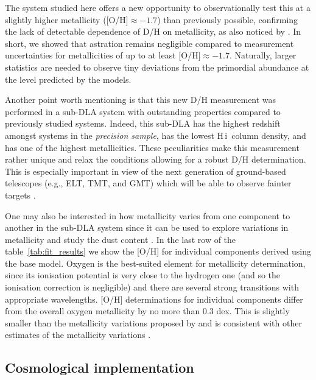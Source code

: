 \documentclass[fleqn,usenatbib]{mnras}
\newcommand{\PK}[1]{{\color{cyan} PK:~ #1}}
\newcommand{\PN}[2][]{{\color{orange} PN:\st{#1}~#2}}  %
\newcommand{\HI}[0]{H\,{\sc i}}
\begin{document}
The system studied here offers a new opportunity to observationally test this at a slightly higher metallicity ([O/H$]\approx -1.7$) than previously possible, confirming the lack of detectable dependence of D/H on metallicity, as also noticed by \cite{Cooke_2016}. In short, we showed that astration remains negligible compared to measurement uncertainties for metallicities of up to at least [O/H$]\approx -1.7$. Naturally, larger statistics are needed to observe tiny deviations from the primordial abundance at the level predicted by the models.

Another point worth mentioning is that this new D/H measurement was performed in a sub-DLA system
with outstanding properties compared to previously studied systems.
Indeed, this sub-DLA has the highest redshift amongst systems in the \textit{precision sample}, has the lowest \HI\ column density, and has one of the highest metallicities. These peculiarities make this  measurement rather unique and relax the conditions allowing for a robust D/H determination. This is especially important in view of the next generation of ground-based telescopes (e.g., ELT, TMT, and GMT) which will be able to observe fainter targets \citep[see also the appendix in][]{Cooke_2016}.

One may also be interested in how metallicity varies from one component to another in the sub-DLA system since it can be used to explore variations in metallicity and study the dust content \citep[see, e.g.,][]{metal_variations}. In the last row of the table~\ref{tab:fit_results} we show the [O/H] for individual components derived using the base model. Oxygen is the best-suited element for metallicity determination, since its ionisation potential is very close to the hydrogen one (and so the ionisation correction is negligible) and there are several strong transitions with appropriate wavelengths. [O/H] determinations for individual components differ from the overall oxygen metallicity by no more than 0.3 dex. This is slightly smaller than the metallicity variations proposed by \cite{De_Cia_2021} and is consistent with other estimates of the metallicity variations \citep{Esteban_2022}.

\subsection{Cosmological implementation}
\end{document}
